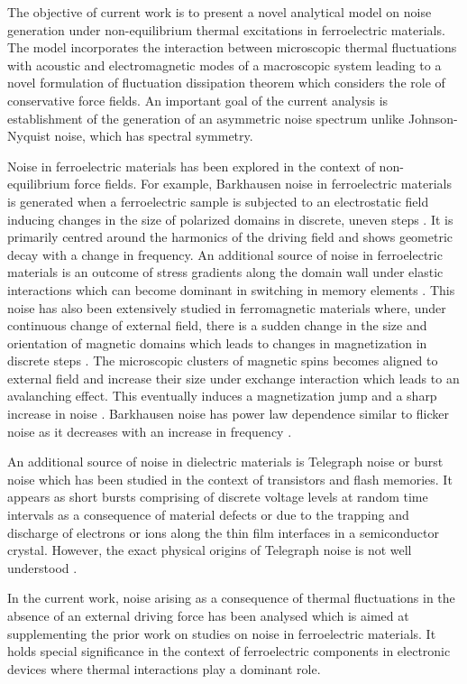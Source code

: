 \documentclass[12pt,column,showpacs,pre,preprintnumbers,amsmath,amssymb,aps,standalone]{revtex4-2}
\begin{document}
The objective of current work is to present a novel analytical model on noise generation under non-equilibrium thermal excitations in ferroelectric materials. The model incorporates the interaction between microscopic thermal fluctuations with acoustic and electromagnetic modes of a macroscopic system leading to a novel formulation of fluctuation dissipation theorem which considers the role of conservative force fields. An important goal of the current analysis is establishment of the generation of an asymmetric noise spectrum unlike Johnson-Nyquist noise, which has spectral symmetry.

Noise in ferroelectric materials has been explored in the context of non-equilibrium force fields. For example, Barkhausen noise in ferroelectric materials is generated when a ferroelectric sample is subjected to an electrostatic field inducing changes in the size of polarized domains in discrete, uneven steps  \cite{16a,16b,16c}. It is primarily centred around the harmonics of the driving field and shows geometric decay with a change in frequency. An additional source of noise in ferroelectric materials is an outcome of stress gradients along the domain wall under elastic interactions which can become dominant in switching in memory elements \cite{16d,16e,16f}. This noise has also been extensively studied in ferromagnetic materials where, under continuous change of external field, there is a sudden change in the size and orientation of magnetic domains which leads to changes in magnetization in discrete steps \cite{16g}. The microscopic clusters of magnetic spins becomes aligned to external field and increase their size under exchange interaction which leads to an avalanching effect. This eventually induces a magnetization jump and a sharp increase in noise \cite{16h}. Barkhausen noise has power law dependence similar to flicker noise as it decreases with an increase in frequency \cite{16i,16j}. 

An additional source of noise in dielectric materials is Telegraph noise or burst noise which has been studied in the context of transistors \cite{17a} and flash memories\cite{17b}. It appears as short bursts comprising of discrete voltage levels at random time intervals as a consequence of material defects or due to the trapping and discharge of electrons or ions along the thin film interfaces in a semiconductor crystal.  However, the exact physical origins of Telegraph noise is not well understood \cite{17c}.

In the current work, noise arising as a consequence of thermal fluctuations in the absence of an external driving force has been analysed which is aimed at supplementing the prior work on studies on noise in ferroelectric materials. It holds special significance in the context of ferroelectric components in electronic devices where thermal interactions play a dominant role. 
\end{document}
